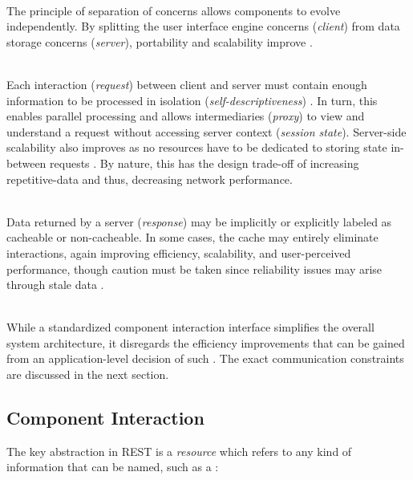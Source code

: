 \begin{appendices}
\begin{description}[format={\storedescriptionlabel}]
	\item[Client-server]
	\hfill \\
	The principle of separation of concerns allows components to evolve independently. By splitting the user interface engine concerns (\textit{client}) from data storage concerns (\textit{server}), portability and scalability improve \cite[p.~78]{fielding2000architectural}.
	\item[Stateless]
	\hfill \\
	Each interaction (\textit{request}) between client and server must contain enough information to be processed in isolation (\textit{self-descriptiveness}) \cite[pp.~78--79]{fielding2000architectural}. In turn, this enables parallel processing and allows intermediaries (\textit{proxy}) to view and understand a request without accessing server context (\textit{session state}). Server-side scalability also improves as no resources have to be dedicated to storing state in-between requests \cite[pp.~79, 93]{fielding2000architectural}. By nature, this has the design trade-off of increasing repetitive-data and thus, decreasing network performance.
	\item[Cache]
	\hfill \\
	Data returned by a server (\textit{response}) may be implicitly or explicitly labeled as cacheable or non-cacheable. In some cases, the cache may entirely eliminate interactions, again improving efficiency, scalability, and user-perceived performance, though caution must be taken since reliability issues may arise through stale data \cite[pp.~79--80]{fielding2000architectural}.
	\item[Uniform interface]
	\hfill \\
	While a standardized component interaction interface simplifies the overall system architecture, it disregards the efficiency improvements that can be gained from an application-level decision of such \cite[pp.~81--82]{fielding2000architectural}. The exact communication constraints are discussed in the next section.
\end{description}


\subsection{Component Interaction}
\label{sec:rest-component-interaction}

The key abstraction in \ac{REST} is a \textit{resource} which refers to any kind of information that can be named, such as a \cite[p.~88]{fielding2000architectural}:


\end{appendices}
